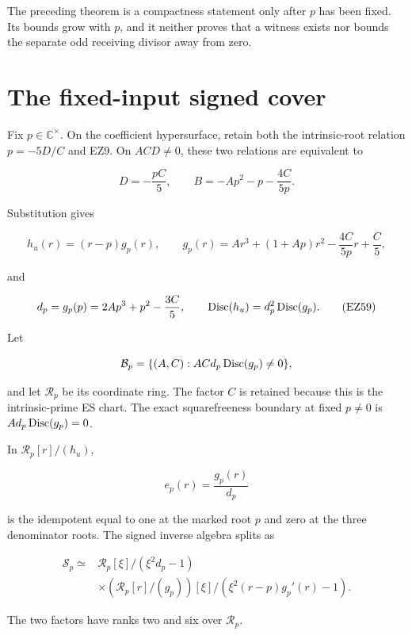 The preceding theorem is a compactness statement only after \(p\) has been
fixed.  Its bounds grow with \(p\), and it neither proves that a witness exists
nor bounds the separate odd receiving divisor away from zero.

\section{The fixed-input signed cover}
\label{sec:fixed-input-cover}

Fix \(p\in\mathbb C^\times\).  On the coefficient hypersurface, retain both
the intrinsic-root relation \(p=-5D/C\) and EZ9.  On \(ACD\ne0\), these two
relations are equivalent to

\begin{equation}
 D=-\frac{pC}{5},\qquad
 B=-Ap^2-p-\frac{4C}{5p}.                             \tag{EZ57}
\end{equation}

Substitution gives

\begin{equation}
 h_u(r)=(r-p)g_p(r),\qquad
 g_p(r)=Ar^3+(1+Ap)r^2-\frac{4C}{5p}r+\frac C5,       \tag{EZ58}
\end{equation}

and

\begin{equation}
 d_p=g_p(p)=2Ap^3+p^2-\frac{3C}{5},\qquad
 \operatorname{Disc}(h_u)=d_p^2\operatorname{Disc}(g_p).                         \tag{EZ59}
\end{equation}

Let

\[
 \mathcal B_p=\{(A,C):A C d_p\operatorname{Disc}(g_p)\ne0\},
\]

and let \(\mathcal R_p\) be its coordinate ring.  The factor \(C\) is retained
because this is the intrinsic-prime ES chart.  The exact squarefreeness
boundary at fixed \(p\ne0\) is \(A d_p\operatorname{Disc}(g_p)=0\).

\begin{theorem}
\label{thm:fixed-input-split}
In \(\mathcal R_p[r]/(h_u)\),

\begin{equation}
 e_p(r)=\frac{g_p(r)}{d_p}                            \tag{EZ60}
\end{equation}

is the idempotent equal to one at the marked root \(p\) and zero at the three
denominator roots.  The signed inverse algebra splits as

\begin{equation}
\boxed{
\begin{aligned}
 \mathcal S_p\simeq{}&
 \mathcal R_p[\xi]/(\xi^2d_p-1)\\
 &\times
 \left(\mathcal R_p[r]/(g_p)\right)[\xi]
 \big/\left(\xi^2(r-p)g_p'(r)-1\right).
\end{aligned}}                                      \tag{EZ61}
\end{equation}

The two factors have ranks two and six over \(\mathcal R_p\).
\end{theorem}

